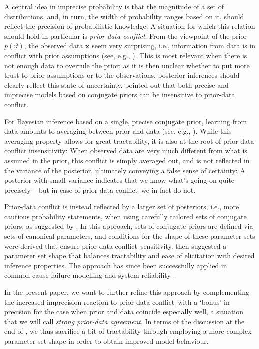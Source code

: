 \documentclass[runningheads,a4paper]{llncs}
\def\pdc{prior-data conflict}
\renewcommand{\vec}[1]{{\bm #1}}
\begin{document}
A central idea in imprecise probability is that the magnitude of a set of distributions,
and, in turn, the width of probability ranges based on it,
should reflect the precision of probabilistic knowledge.
A situation for which this relation should hold in particular is \emph{\pdc}:
From the viewpoint of the prior $p(\vartheta)$, the observed data $\vec{x}$ seem very surprising,
i.e., information from data is in conflict with prior assumptions (see, e.g., \cite{2006:evans}). %
This is most relevant when there is not enough data to overrule the prior;
as it is then unclear whether to put more trust to prior assumptions or to the observations,
posterior inferences should clearly reflect this state of uncertainty.
\cite{Walter2009a} pointed out that
both precise and imprecise models based on conjugate priors can be insensitive to prior-data conflict.

For Bayesian inference based on a single, precise conjugate prior,
learning from data amounts to averaging between prior and data
(see, e.g., \cite[\S~1.2.3.1]{2013:diss-gw}).
While this averaging property allows for great tractability,
it is also at the root of prior-data conflict insensitivity: 
When observed data are very much different from what is assumed in the prior,
this conflict is simply averaged out,
and is not reflected in the variance of the posterior,
ultimately conveying a false sense of certainty:
A posterior with small variance indicates that we know what's going on quite precisely -- but in case of \pdc\ we in fact do not.

Prior-data conflict is instead reflected by a larger set of posteriors,
i.e., more cautious probability statements,
when using carefully tailored sets of conjugate priors,
as suggested by \cite{Walter2009a}.
In this approach, sets of conjugate priors are defined via sets of canonical parameters,
and conditions for the shape of these parameter sets were derived that ensure \pdc\ sensitivity.
\cite{Walter2009a} then suggested a parameter set shape
that balances tractability and ease of elicitation
with desired inference properties.
The approach has since been successfully applied in common-cause failure modelling \cite{Troffaes2014a}
and system reliability \cite{2015:walter}.

In the present paper, we want to further refine this approach
by complementing the increased imprecision reaction to \pdc\
with a `bonus' in precision for the case when prior and data coincide especially well,
a situation that we will call \emph{strong prior-data agreement}.
In terms of the discussion at the end of \cite[\S~3.1.4]{2013:diss-gw},
we thus sacrifice a bit of tractability through employing a more complex parameter set shape
in order to obtain improved model behaviour.%
\end{document}
